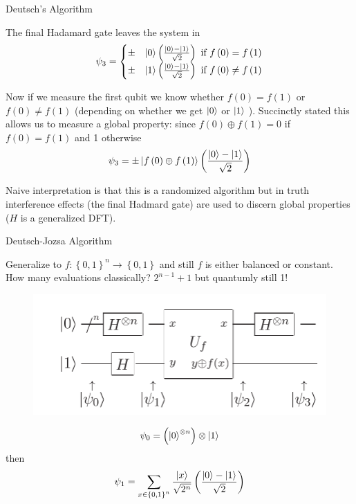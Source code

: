 \documentclass{beamer}
\begin{document}
\begin{frame}{Deutsch's Algorithm}

The final Hadamard gate leaves the system in
\[
\psi_{3}=\begin{cases}
\pm & \Ket{0}\left(\frac{\Ket{0}-\Ket{1}}{\sqrt{2}}\right)\text{ if }f\left(0\right)=f\left(1\right)\\
\pm & \Ket{1}\left(\frac{\Ket{0}-\Ket{1}}{\sqrt{2}}\right)\text{ if }f\left(0\right)\neq f\left(1\right)
\end{cases}
\]

Now if we measure the first qubit we know whether $f\left(0\right)=f\left(1\right)$
or $f\left(0\right)\neq f\left(1\right)$ (depending on whether we get $\Ket{0}$ or $\Ket{1}$ ). Succinctly stated this allows us to measure a global property: since $f\left(0\right)\oplus f\left(1\right)=0$ if $f\left(0\right)=f\left(1\right)$ and 1 otherwise
\[
\psi_{3}=\pm\Ket{f\left(0\right)\oplus f\left(1\right)}\left(\frac{\Ket{0}-\Ket{1}}{\sqrt{2}}\right)
\] 

Naive interpretation is that this is a randomized algorithm but in truth interference effects (the final Hadmard gate)
are used to discern global properties ($H$ is a generalized DFT).
 

\end{frame}

\begin{frame}{Deutsch-Jozsa Algorithm}

Generalize to $f:\left\{ 0,1\right\} ^{n}\to\left\{ 0,1\right\} $ and still $f$ is either balanced or constant.
How many evaluations classically? $2^{n-1}+1$ but quantumly still 1!
 
\begin{figure}[ht]
  \includegraphics[scale=0.33]{pasted2}
\end{figure}

\[
\psi_{0}=\left(\Ket{0}^{\otimes n}\right)\otimes\Ket{1}
\]
 then 
\[
\psi_{1}=\sum_{x\in\left\{ 0,1\right\} ^{n}}\frac{\Ket{x}}{\sqrt{2^{n}}}\left(\frac{\Ket{0}-\Ket{1}}{\sqrt{2}}\right)
\]

\end{frame}
\end{document}
